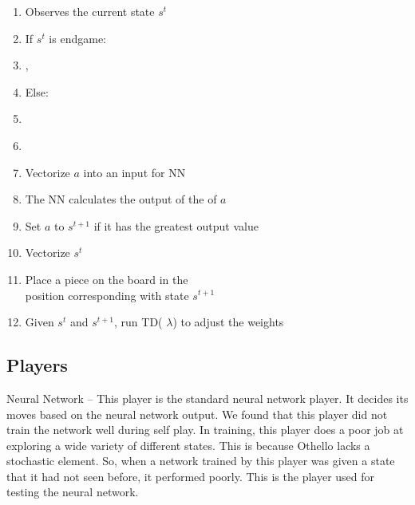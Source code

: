 \documentclass{sig-alternate-05-2015}
\begin{document}
\begin{enumerate}
\itemsep0em 
\item Observes the current state $s^t$
\item  If $s^t$ is endgame:
\item  \hspace*{.5cm}, \\  \hspace*{.5cm}
\item   Else:
\item   \hspace*{.5cm} \\  \hspace*{.5cm}
\item   \hspace*{.5cm}
\item  \hspace*{1cm}Vectorize $a$ into an input for NN
\item \hspace*{1cm}The NN calculates the output of the of $a$
\item \hspace*{1cm}Set $a$ to $s^{t+1}$ if it has the greatest output value
\item   \hspace*{.5cm}Vectorize $s^t$
\item   \hspace*{.5cm}Place a piece on the board in the \\ \hspace*{.5cm} position corresponding with state $s^{t+1}$
\item   Given $s^t$ and $s^{t+1}$, run TD( $\lambda$) to adjust the weights
\end{enumerate}


\subsection{Players}
Neural Network -- This player is the standard neural network player. It decides its moves based on the neural network output. We found that this player did not train the network well during self play. In training, this player does a poor job at exploring a wide variety of different states. This is because Othello lacks a stochastic element. So, when a network trained by this player was given a state that it had not seen before, it performed poorly. This is the player used for testing the neural network.
\end{document}
